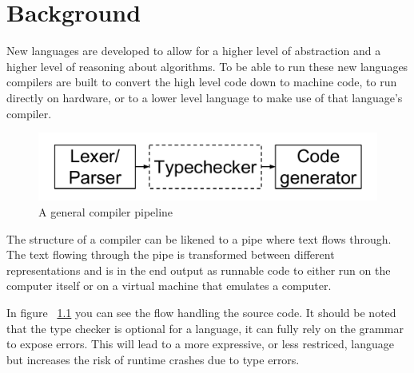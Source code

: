 \chapter{Background}


New languages are developed to allow for a higher level of abstraction and a higher
level of reasoning about algorithms. To be able to run these new languages
compilers are built to convert the high level code down to machine code, to run 
directly on hardware, or to a lower level language to make use of that language's compiler. 



\begin{figure}[h!]
  \centering
  \includegraphics[width=0.6\pdfpagewidth]{figure/general-pipeline}
  \caption{A general compiler pipeline}
  \label{fig:generalpipeline}
\end{figure}


The structure of a compiler can be likened to a pipe where text flows through. 
The text flowing through the pipe is transformed between different representations and is in
the end output as runnable code to either run on the computer itself or on a virtual machine
that emulates a computer. 

In figure ~\ref{fig:generalpipeline} you can see the flow handling the source code.
It should be noted that the type checker is optional for a language, it can
fully rely on the grammar to expose errors. This will lead to a more expressive, 
or less restriced, language but increases the risk of runtime crashes due to type errors.











